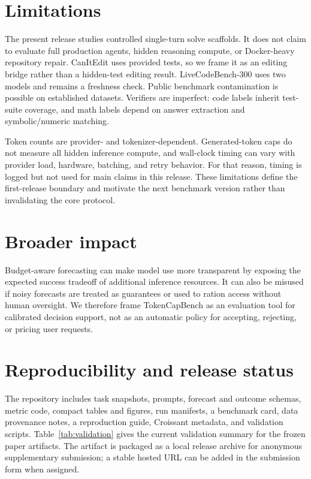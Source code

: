 \documentclass{article}
\newcommand{\bench}{TokenCapBench\xspace}
\begin{document}
\section{Limitations}

The present release studies controlled single-turn solve scaffolds. It does not claim to evaluate full production agents, hidden reasoning compute, or Docker-heavy repository repair. CanItEdit uses provided tests, so we frame it as an editing bridge rather than a hidden-test editing result. LiveCodeBench-300 uses two models and remains a freshness check. Public benchmark contamination is possible on established datasets. Verifiers are imperfect: code labels inherit test-suite coverage, and math labels depend on answer extraction and symbolic/numeric matching.

Token counts are provider- and tokenizer-dependent. Generated-token caps do not measure all hidden inference compute, and wall-clock timing can vary with provider load, hardware, batching, and retry behavior. For that reason, timing is logged but not used for main claims in this release. These limitations define the first-release boundary and motivate the next benchmark version rather than invalidating the core protocol.

\section{Broader impact}

Budget-aware forecasting can make model use more transparent by exposing the expected success tradeoff of additional inference resources. It can also be misused if noisy forecasts are treated as guarantees or used to ration access without human oversight. We therefore frame \bench{} as an evaluation tool for calibrated decision support, not as an automatic policy for accepting, rejecting, or pricing user requests.

\section{Reproducibility and release status}

The repository includes task snapshots, prompts, forecast and outcome schemas, metric code, compact tables and figures, run manifests, a benchmark card, data provenance notes, a reproduction guide, Croissant metadata, and validation scripts. Table~\ref{tab:validation} gives the current validation summary for the frozen paper artifacts. The artifact is packaged as a local release archive for anonymous supplementary submission; a stable hosted URL can be added in the submission form when assigned.
\end{document}
